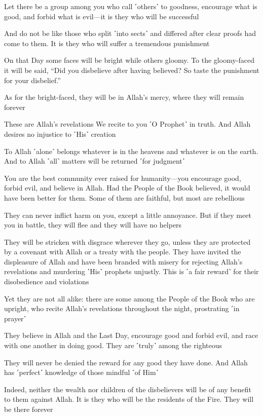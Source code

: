 Let there be a group among you who call ˹others˺ to goodness, encourage what is good, and forbid what is evil—it is they who will be successful

And do not be like those who split ˹into sects˺ and differed after clear proofs had come to them. It is they who will suffer a tremendous punishment

On that Day some faces will be bright while others gloomy. To the gloomy-faced it will be said, “Did you disbelieve after having believed? So taste the punishment for your disbelief.”

As for the bright-faced, they will be in Allah’s mercy, where they will remain forever

These are Allah’s revelations We recite to you ˹O Prophet˺ in truth. And Allah desires no injustice to ˹His˺ creation

To Allah ˹alone˺ belongs whatever is in the heavens and whatever is on the earth. And to Allah ˹all˺ matters will be returned ˹for judgment˺

You are the best community ever raised for humanity—you encourage good, forbid evil, and believe in Allah. Had the People of the Book believed, it would have been better for them. Some of them are faithful, but most are rebellious

They can never inflict harm on you, except a little annoyance. But if they meet you in battle, they will flee and they will have no helpers

They will be stricken with disgrace wherever they go, unless they are protected by a covenant with Allah or a treaty with the people. They have invited the displeasure of Allah and have been branded with misery for rejecting Allah’s revelations and murdering ˹His˺ prophets unjustly. This is ˹a fair reward˺ for their disobedience and violations

Yet they are not all alike: there are some among the People of the Book who are upright, who recite Allah’s revelations throughout the night, prostrating ˹in prayer˺

They believe in Allah and the Last Day, encourage good and forbid evil, and race with one another in doing good. They are ˹truly˺ among the righteous

They will never be denied the reward for any good they have done. And Allah has ˹perfect˺ knowledge of those mindful ˹of Him˺

Indeed, neither the wealth nor children of the disbelievers will be of any benefit to them against Allah. It is they who will be the residents of the Fire. They will be there forever


